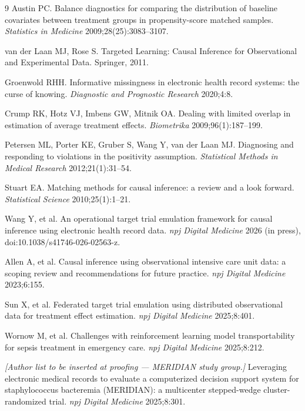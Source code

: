 \documentclass[11pt,a4paper]{article}
\begin{document}
\begin{thebibliography}{9}
 Austin PC.
Balance diagnostics for comparing the distribution of baseline covariates between treatment groups in propensity-score matched samples.
\emph{Statistics in Medicine} 2009;28(25):3083--3107.

 van der Laan MJ, Rose S.
Targeted Learning: Causal Inference for Observational and Experimental Data.
Springer, 2011.

 Groenwold RHH.
Informative missingness in electronic health record systems: the curse of knowing.
\emph{Diagnostic and Prognostic Research} 2020;4:8.

 Crump RK, Hotz VJ, Imbens GW, Mitnik OA.
Dealing with limited overlap in estimation of average treatment effects.
\emph{Biometrika} 2009;96(1):187--199.

 Petersen ML, Porter KE, Gruber S, Wang Y, van der Laan MJ.
Diagnosing and responding to violations in the positivity assumption.
\emph{Statistical Methods in Medical Research} 2012;21(1):31--54.

 Stuart EA.
Matching methods for causal inference: a review and a look forward.
\emph{Statistical Science} 2010;25(1):1--21.

 Wang Y, et al.
An operational target trial emulation framework for causal inference using electronic health record data.
\emph{npj Digital Medicine} 2026 (in press), doi:10.1038/s41746-026-02563-z.

 Allen A, et al.
Causal inference using observational intensive care unit data: a scoping review and recommendations for future practice.
\emph{npj Digital Medicine} 2023;6:155.

 Sun X, et al.
Federated target trial emulation using distributed observational data for treatment effect estimation.
\emph{npj Digital Medicine} 2025;8:401.

 Wornow M, et al.
Challenges with reinforcement learning model transportability for sepsis treatment in emergency care.
\emph{npj Digital Medicine} 2025;8:212.

 \emph{[Author list to be inserted at proofing --- MERIDIAN study group.]}
Leveraging electronic medical records to evaluate a computerized decision support system for staphylococcus bacteremia (MERIDIAN): a multicenter stepped-wedge cluster-randomized trial.
\emph{npj Digital Medicine} 2025;8:301.


\end{thebibliography}
\end{document}
